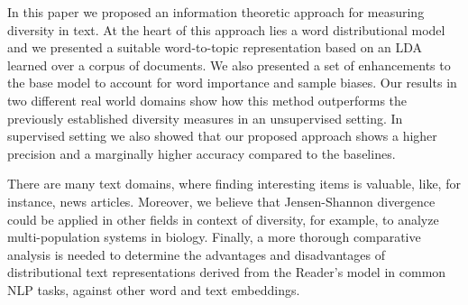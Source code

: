 In this paper we proposed an information theoretic approach for measuring diversity in text. At the heart of this approach lies a word distributional model and we presented a suitable word-to-topic representation based on an LDA learned over a corpus of documents. We also presented a set of enhancements to the base model to account for word importance and sample biases. Our results in two different real world domains show how this method outperforms the previously established  diversity measures in an unsupervised setting. In supervised setting we also showed that our proposed approach shows a higher precision and a marginally higher accuracy compared to the baselines.

There are many text domains, where finding interesting items is valuable, 
like, for instance, news articles. Moreover, we believe that Jensen-Shannon 
divergence could be applied in other fields in context of diversity, for example, 
to analyze multi-population systems in biology. Finally, a more thorough comparative analysis 
is needed to determine the advantages and disadvantages of distributional text 
representations derived from the Reader's model in common NLP tasks, 
against other word and text embeddings.

 